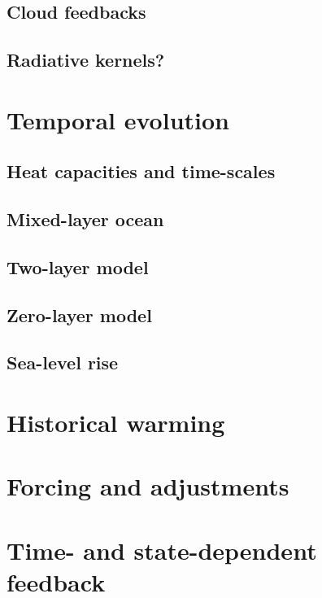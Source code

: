 \documentclass[12pt]{book}
\begin{document}
\section{Cloud feedbacks}
\section{Radiative kernels?}

\chapter{Temporal evolution}
\section{Heat capacities and time-scales}
\section{Mixed-layer ocean}
\section{Two-layer model}
\section{Zero-layer model}
\section{Sea-level rise}

\chapter{Historical warming}

\chapter{Forcing and adjustments}

\chapter{Time- and state-dependent feedback}
\end{document}
